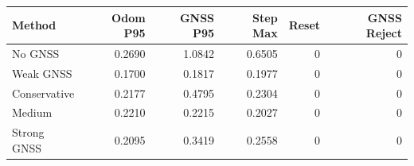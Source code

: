 \begin{tabular}{lrrrrr}
\hline
Method & Odom P95 & GNSS P95 & Step Max & Reset & GNSS Reject \\
\hline
No GNSS & 0.2690 & 1.0842 & 0.6505 & 0 & 0 \\
Weak GNSS & 0.1700 & 0.1817 & 0.1977 & 0 & 0 \\
Conservative & 0.2177 & 0.4795 & 0.2304 & 0 & 0 \\
Medium & 0.2210 & 0.2215 & 0.2027 & 0 & 0 \\
Strong GNSS & 0.2095 & 0.3419 & 0.2558 & 0 & 0 \\
\hline
\end{tabular}

